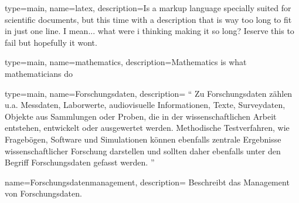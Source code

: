 

{
    type=main,
    name=latex,
    description={Is a markup language specially suited
            for scientific documents, but this time with a description that is way too long to fit in just one line. I mean... what were i thinking making it so long? Ieserve this to fail but hopefully it wont.}
}

{
    type=main,
    name=mathematics,
    description={Mathematics is what mathematicians do}
}

{
    type=main,
    name=Forschungsdaten,
    description={
            \enquote{
                Zu Forschungsdaten zählen u.a. Messdaten, Laborwerte, audiovisuelle Informationen, Texte, Surveydaten, Objekte aus Sammlungen oder Proben, die in der wissenschaftlichen Arbeit entstehen, entwickelt oder ausgewertet werden. Methodische Testverfahren, wie Fragebögen, Software und Simulationen können ebenfalls zentrale Ergebnisse wissenschaftlicher Forschung darstellen und sollten daher ebenfalls unter den Begriff Forschungsdaten gefasst werden.
            } \cite{SENA15}
        }
}

{
    name=Forschungsdatenmanagement,
    description={
            Beschreibt das Management von \Gls{Forschungsdaten}.
        }
}
